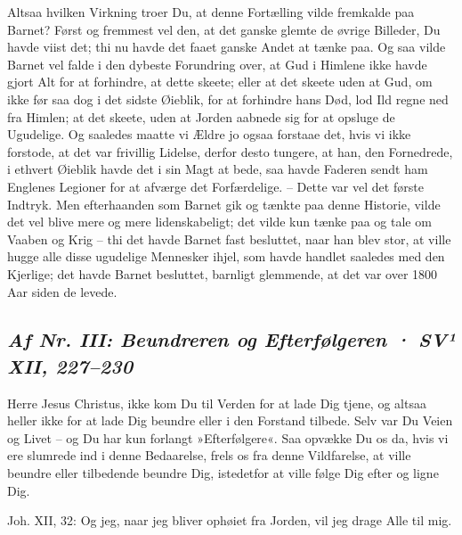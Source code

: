 \documentclass[12pt,a4paper]{article}
\newcommand{\sectionheading}[1]{\subsection*{\normalfont\itshape #1}}
\begin{document}
Altsaa hvilken Virkning troer Du, at denne Fortælling vilde fremkalde paa Barnet? Først og fremmest vel den, at det ganske glemte de øvrige Billeder, Du havde viist det; thi nu havde det faaet ganske Andet at tænke paa. Og saa vilde Barnet vel falde i den dybeste Forundring over, at Gud i Himlene ikke havde gjort Alt for at forhindre, at dette skeete; eller at det skeete uden at Gud, om ikke før saa dog i det sidste Øieblik, for at forhindre hans Død, lod Ild regne ned fra Himlen; at det skeete, uden at Jorden aabnede sig for at opsluge de Ugudelige. Og saaledes maatte vi Ældre jo ogsaa forstaae det, hvis vi ikke forstode, at det var frivillig Lidelse, derfor desto tungere, at han, den Fornedrede, i ethvert Øieblik havde det i sin Magt at bede, saa havde Faderen sendt ham Englenes Legioner for at afværge det Forfærdelige. – Dette var vel det første Indtryk. Men efterhaanden som Barnet gik og tænkte paa denne Historie, vilde det vel blive mere og mere lidenskabeligt; det vilde kun tænke paa og tale om Vaaben og Krig – thi det havde Barnet fast besluttet, naar han blev stor, at ville hugge alle disse ugudelige Mennesker ihjel, som havde handlet saaledes med den Kjerlige; det havde Barnet besluttet, barnligt glemmende, at det var over 1800 Aar siden de levede.

\sectionheading{Af Nr. III: Beundreren og Efterfølgeren  ·  SV¹ XII, 227–230}

Herre Jesus Christus, ikke kom Du til Verden for at lade Dig tjene, og altsaa heller ikke for at lade Dig beundre eller i den Forstand tilbede. Selv var Du Veien og Livet – og Du har kun forlangt »Efterfølgere«. Saa opvække Du os da, hvis vi ere slumrede ind i denne Bedaarelse, frels os fra denne Vildfarelse, at ville beundre eller tilbedende beundre Dig, istedetfor at ville følge Dig efter og ligne Dig.

Joh. XII, 32: Og jeg, naar jeg bliver ophøiet fra Jorden, vil jeg drage Alle til mig.
\end{document}
